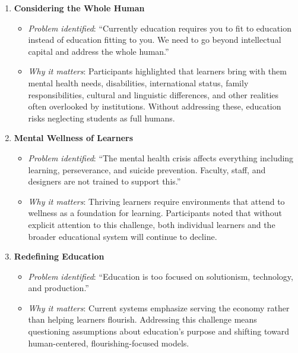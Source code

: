 \documentclass[
  letterpaper,
  DIV=11,
  numbers=noendperiod]{scrartcl}
\begin{document}
\begin{enumerate}
\def\labelenumi{\arabic{enumi}.}
\item
  \textbf{Considering the Whole Human}

  \begin{itemize}
  \item
    \emph{Problem identified}: ``Currently education requires you to fit
    to education instead of education fitting to you. We need to go
    beyond intellectual capital and address the whole human.''
  \item
    \emph{Why it matters}: Participants highlighted that learners bring
    with them mental health needs, disabilities, international status,
    family responsibilities, cultural and linguistic differences, and
    other realities often overlooked by institutions. Without addressing
    these, education risks neglecting students as full humans.
  \end{itemize}
\item
  \textbf{Mental Wellness of Learners}

  \begin{itemize}
  \item
    \emph{Problem identified}: ``The mental health crisis affects
    everything including learning, perseverance, and suicide prevention.
    Faculty, staff, and designers are not trained to support this.''
  \item
    \emph{Why it matters}: Thriving learners require environments that
    attend to wellness as a foundation for learning. Participants noted
    that without explicit attention to this challenge, both individual
    learners and the broader educational system will continue to
    decline.
  \end{itemize}
\item
  \textbf{Redefining Education}

  \begin{itemize}
  \item
    \emph{Problem identified}: ``Education is too focused on
    solutionism, technology, and production.''
  \item
    \emph{Why it matters}: Current systems emphasize serving the economy
    rather than helping learners flourish. Addressing this challenge
    means questioning assumptions about education's purpose and shifting
    toward human-centered, flourishing-focused models.
  \end{itemize}
\end{enumerate}
\end{document}
